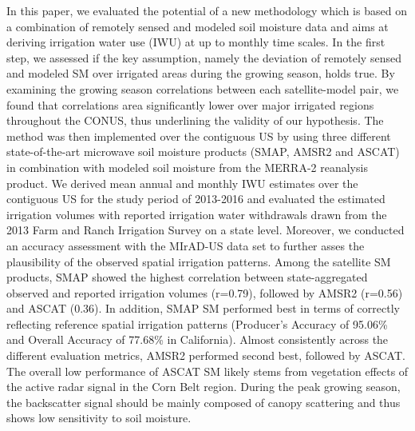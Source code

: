 \documentclass[hess, manuscript]{copernicus}
\begin{document}
In this paper, we evaluated the potential of a new methodology which is based on a combination of remotely sensed and modeled soil moisture data and aims at deriving irrigation water use (IWU) at up to monthly time scales. In the first step, we assessed if the key assumption, namely the deviation of remotely sensed and modeled SM over irrigated areas during the growing season, holds true. By examining the growing season correlations between each satellite-model pair, we found that correlations area significantly lower over major irrigated regions throughout the CONUS, thus underlining the validity of our hypothesis. The method was then implemented over the contiguous US by using three different state-of-the-art microwave soil moisture products (SMAP, AMSR2 and ASCAT) in combination with modeled soil moisture from the MERRA-2 reanalysis product. We derived mean annual and monthly IWU estimates over the contiguous US for the study period of 2013-2016 and evaluated the estimated irrigation volumes with reported irrigation water withdrawals drawn from the 2013 Farm and Ranch Irrigation Survey \citep{fris2013} on a state level. Moreover, we conducted an accuracy assessment with the MIrAD-US data set \citep{Pervez_2010} to further asses the plausibility of the observed spatial irrigation patterns. Among the satellite SM products, SMAP showed the highest correlation between state-aggregated observed and reported irrigation volumes (r=0.79), followed by AMSR2 (r=0.56) and ASCAT (0.36). In addition, SMAP SM performed best in terms of correctly reflecting reference spatial irrigation patterns (Producer's Accuracy of 95.06\% and Overall Accuracy of 77.68\% in California). Almost consistently across the different evaluation metrics, AMSR2  performed second best, followed by ASCAT. The overall low performance of ASCAT SM likely stems from vegetation effects of the active radar signal in the Corn Belt region. During the peak growing season, the backscatter signal should be mainly composed of canopy scattering and thus shows low sensitivity to soil moisture.\\ 
\end{document}
